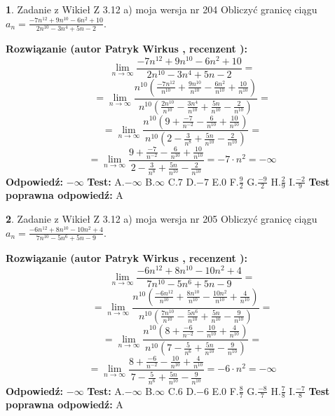 \documentclass[12pt, a4paper]{article}
\theoremstyle{definition} %
\newtheorem{zad}{}
\newcommand{\zadStart}[1]{\begin{zad}#1\newline}
\newcommand{\zadStop}{\end{zad}}
\newcommand{\rozwStart}[2]{\noindent \textbf{Rozwiązanie (autor #1 , recenzent #2): }\newline}
\newcommand{\rozwStop}{\newline}
\newcommand{\odpStart}{\noindent \textbf{Odpowiedź:}\newline}
\newcommand{\odpStop}{\newline}
\newcommand{\testStart}{\noindent \textbf{Test:}\newline}
\newcommand{\testStop}{\newline}
\newcommand{\kluczStart}{\noindent \textbf{Test poprawna odpowiedź:}\newline}
\newcommand{\kluczStop}{\newline}
\begin{document}
\zadStart{Zadanie z Wikieł Z 3.12 a) moja wersja nr 204}
Obliczyć granicę ciągu $a_{n}=\frac{-7n^{12}+9n^{10}-6n^{2}+10}{2n^{10}-3n^{4}+5n-2}$.
\zadStop
\rozwStart{Patryk Wirkus}{}
$$\lim\limits_{n\to\infty}\frac{-7n^{12}+9n^{10}-6n^{2}+10}{2n^{10}-3n^{4}+5n-2}=$$
$$=\lim\limits_{n\to\infty}\frac{n^{10}\left(\frac{-7n^{12}}{n^{10}}+\frac{9n^{10}}{n^{10}}-\frac{6n^{2}}{n^{10}}+\frac{10}{n^{10}}\right)}{n^{10}\left(\frac{2n^{10}}{n^{10}}-\frac{3n^{4}}{n^{10}}+\frac{5n}{n^{10}}-\frac{2}{n^{10}}\right)}=$$
$$=\lim\limits_{n\to\infty}\frac{n^{10}\left(9+\frac{-7}{n^{-2}}-\frac{6}{n^{10}}+\frac{10}{n^{10}}\right)}
{n^{10}\left(2-\frac{3}{n^{8}}+\frac{5n}{n^{10}}-\frac{2}{n^{10}}\right)}=$$
$$=\lim\limits_{n\to\infty}\frac{9+\frac{-7}{n^{-2}}-\frac{6}{n^{10}}+\frac{10}{n^{10}}}{2-\frac{3}{n^{8}}+\frac{5n}{n^{10}}-\frac{2}{n^{10}}}=-7\cdot n^{2} = -\infty$$
\rozwStop
\odpStart
$-\infty$
\odpStop
\testStart
A.$-\infty$
B.$\infty$
C.$7$
D.$-7$
E.$0$
F.$\frac{9}{2}$
G.$\frac{-9}{2}$
H.$\frac{2}{9}$
I.$\frac{-2}{9}$
\testStop
\kluczStart
A
\kluczStop



\zadStart{Zadanie z Wikieł Z 3.12 a) moja wersja nr 205}
Obliczyć granicę ciągu $a_{n}=\frac{-6n^{12}+8n^{10}-10n^{2}+4}{7n^{10}-5n^{6}+5n-9}$.
\zadStop
\rozwStart{Patryk Wirkus}{}
$$\lim\limits_{n\to\infty}\frac{-6n^{12}+8n^{10}-10n^{2}+4}{7n^{10}-5n^{6}+5n-9}=$$
$$=\lim\limits_{n\to\infty}\frac{n^{10}\left(\frac{-6n^{12}}{n^{10}}+\frac{8n^{10}}{n^{10}}-\frac{10n^{2}}{n^{10}}+\frac{4}{n^{10}}\right)}{n^{10}\left(\frac{7n^{10}}{n^{10}}-\frac{5n^{6}}{n^{10}}+\frac{5n}{n^{10}}-\frac{9}{n^{10}}\right)}=$$
$$=\lim\limits_{n\to\infty}\frac{n^{10}\left(8+\frac{-6}{n^{-2}}-\frac{10}{n^{10}}+\frac{4}{n^{10}}\right)}
{n^{10}\left(7-\frac{5}{n^{6}}+\frac{5n}{n^{10}}-\frac{9}{n^{10}}\right)}=$$
$$=\lim\limits_{n\to\infty}\frac{8+\frac{-6}{n^{-2}}-\frac{10}{n^{10}}+\frac{4}{n^{10}}}{7-\frac{5}{n^{6}}+\frac{5n}{n^{10}}-\frac{9}{n^{10}}}=-6\cdot n^{2} = -\infty$$
\rozwStop
\odpStart
$-\infty$
\odpStop
\testStart
A.$-\infty$
B.$\infty$
C.$6$
D.$-6$
E.$0$
F.$\frac{8}{7}$
G.$\frac{-8}{7}$
H.$\frac{7}{8}$
I.$\frac{-7}{8}$
\testStop
\kluczStart
A
\kluczStop
\end{document}
